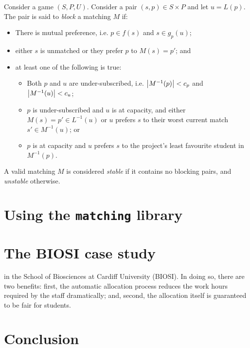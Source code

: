\begin{definition}\label{def:sa_blocking}
    Consider a game \((S, P, U)\). Consider a pair \((s, p) \in S \times P\) and
    let \(u = L(p)\). The pair is said to \emph{block} a matching \(M\) if:

    \begin{itemize}
        \item There is mutual preference, i.e. \(p \in f(s)\) and \(s \in
            g_p(u)\);
        \item either \(s\) is unmatched or they prefer \(p\) to \(M(s) = p'\);
            and
        \item at least one of the following is true:
            \begin{itemize}
                \item Both \(p\) and \(u\) are under-subscribed, i.e.
                    \(\abs*{M^{-1}(p)} < c_p\) and \(\abs*{M^{-1}(u)} < c_u\);
                \item \(p\) is under-subscribed and \(u\) is at capacity, and
                    either \(M(s) = p' \in L^{-1}(u)\) or \(u\) prefers \(s\) to
                    their worst current match \(s' \in M^{-1}(u)\); or
                \item \(p\) is at capacity and \(u\) prefers \(s\) to the
                    project's least favourite student in \(M^{-1}(p)\).
            \end{itemize}
    \end{itemize}

    A valid matching \(M\) is considered \emph{stable} if it contains no
    blocking pairs, and \emph{unstable} otherwise.
\end{definition}


\section{Using the \texttt{matching} library}\label{sec:matching}



\section{The BIOSI case study}\label{sec:biosi}

in the School of Biosciences at Cardiff University (BIOSI). In doing
so, there are two benefits: first, the automatic allocation process reduces the
work hours required by the staff dramatically; and, second, the allocation
itself is guaranteed to be fair for students.


\section{Conclusion}\label{sec:conclusion}
